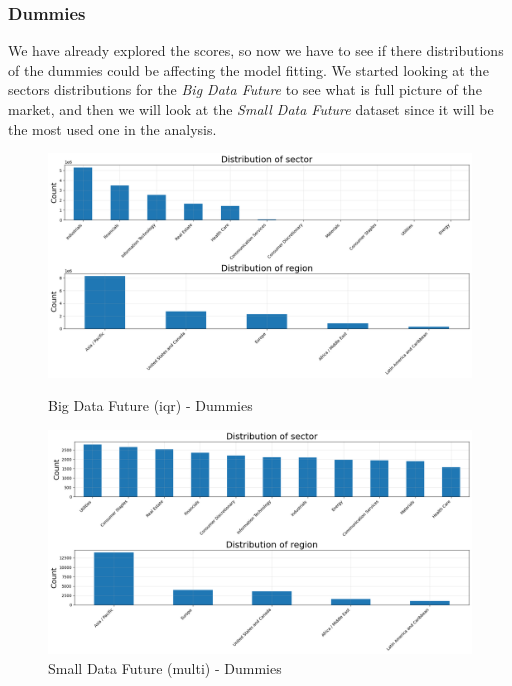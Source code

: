 \documentclass[11pt,english,a4paper,hidelinks]{book}
\begin{document}
\subsubsection{Dummies}

We have already explored the scores, so now we have to see if there distributions of the dummies could be affecting the model fitting. We started looking at the sectors distributions for the \textit{Big Data Future} to see what is full picture of the market, and then we will look at the \textit{Small Data Future} dataset since it will be the most used one in the analysis.

\begin{figure}[H]
    \centering
    \begin{minipage}{0.48\textwidth}
        \centering
        \includegraphics[width=1\linewidth]{images/code/descriptive analysis/distributions/Big Data future - Dummies.png}
        \caption{Big Data Future (\acrshort{iqr}) - Dummies}
        \label{fig:big_future_dummies}
    \end{minipage}\hfill
    \begin{minipage}{0.48\textwidth}
        \centering
        \includegraphics[width=1\linewidth]{images/code/descriptive analysis/distributions/Small Data future MCOD - Dummies.png}
        \caption{Small Data Future (\acrshort{multi}) - Dummies}
        \label{fig:small_future_dummies}
    \end{minipage}
\end{figure}
\end{document}
